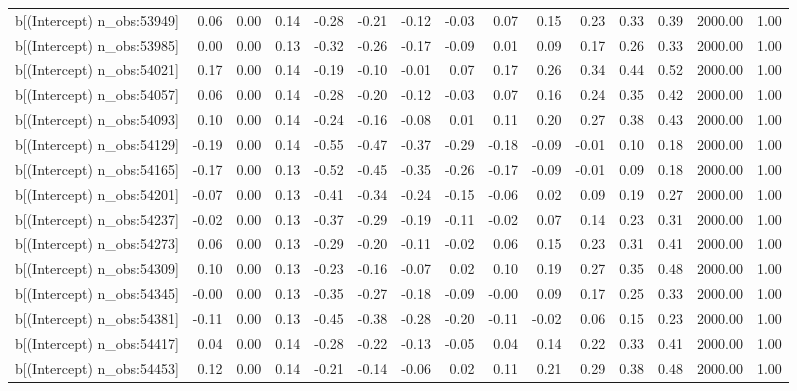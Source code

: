 \begin{table}[ht]
\begin{tabular}{rrrrrrrrrrrrrrr}
  b[(Intercept) n\_obs:53949] & 0.06 & 0.00 & 0.14 & -0.28 & -0.21 & -0.12 & -0.03 & 0.07 & 0.15 & 0.23 & 0.33 & 0.39 & 2000.00 & 1.00 \\ 
  b[(Intercept) n\_obs:53985] & 0.00 & 0.00 & 0.13 & -0.32 & -0.26 & -0.17 & -0.09 & 0.01 & 0.09 & 0.17 & 0.26 & 0.33 & 2000.00 & 1.00 \\ 
  b[(Intercept) n\_obs:54021] & 0.17 & 0.00 & 0.14 & -0.19 & -0.10 & -0.01 & 0.07 & 0.17 & 0.26 & 0.34 & 0.44 & 0.52 & 2000.00 & 1.00 \\ 
  b[(Intercept) n\_obs:54057] & 0.06 & 0.00 & 0.14 & -0.28 & -0.20 & -0.12 & -0.03 & 0.07 & 0.16 & 0.24 & 0.35 & 0.42 & 2000.00 & 1.00 \\ 
  b[(Intercept) n\_obs:54093] & 0.10 & 0.00 & 0.14 & -0.24 & -0.16 & -0.08 & 0.01 & 0.11 & 0.20 & 0.27 & 0.38 & 0.43 & 2000.00 & 1.00 \\ 
  b[(Intercept) n\_obs:54129] & -0.19 & 0.00 & 0.14 & -0.55 & -0.47 & -0.37 & -0.29 & -0.18 & -0.09 & -0.01 & 0.10 & 0.18 & 2000.00 & 1.00 \\ 
  b[(Intercept) n\_obs:54165] & -0.17 & 0.00 & 0.13 & -0.52 & -0.45 & -0.35 & -0.26 & -0.17 & -0.09 & -0.01 & 0.09 & 0.18 & 2000.00 & 1.00 \\ 
  b[(Intercept) n\_obs:54201] & -0.07 & 0.00 & 0.13 & -0.41 & -0.34 & -0.24 & -0.15 & -0.06 & 0.02 & 0.09 & 0.19 & 0.27 & 2000.00 & 1.00 \\ 
  b[(Intercept) n\_obs:54237] & -0.02 & 0.00 & 0.13 & -0.37 & -0.29 & -0.19 & -0.11 & -0.02 & 0.07 & 0.14 & 0.23 & 0.31 & 2000.00 & 1.00 \\ 
  b[(Intercept) n\_obs:54273] & 0.06 & 0.00 & 0.13 & -0.29 & -0.20 & -0.11 & -0.02 & 0.06 & 0.15 & 0.23 & 0.31 & 0.41 & 2000.00 & 1.00 \\ 
  b[(Intercept) n\_obs:54309] & 0.10 & 0.00 & 0.13 & -0.23 & -0.16 & -0.07 & 0.02 & 0.10 & 0.19 & 0.27 & 0.35 & 0.48 & 2000.00 & 1.00 \\ 
  b[(Intercept) n\_obs:54345] & -0.00 & 0.00 & 0.13 & -0.35 & -0.27 & -0.18 & -0.09 & -0.00 & 0.09 & 0.17 & 0.25 & 0.33 & 2000.00 & 1.00 \\ 
  b[(Intercept) n\_obs:54381] & -0.11 & 0.00 & 0.13 & -0.45 & -0.38 & -0.28 & -0.20 & -0.11 & -0.02 & 0.06 & 0.15 & 0.23 & 2000.00 & 1.00 \\ 
  b[(Intercept) n\_obs:54417] & 0.04 & 0.00 & 0.14 & -0.28 & -0.22 & -0.13 & -0.05 & 0.04 & 0.14 & 0.22 & 0.33 & 0.41 & 2000.00 & 1.00 \\ 
  b[(Intercept) n\_obs:54453] & 0.12 & 0.00 & 0.14 & -0.21 & -0.14 & -0.06 & 0.02 & 0.11 & 0.21 & 0.29 & 0.38 & 0.48 & 2000.00 & 1.00 \\ 

\end{tabular}
\end{table}
